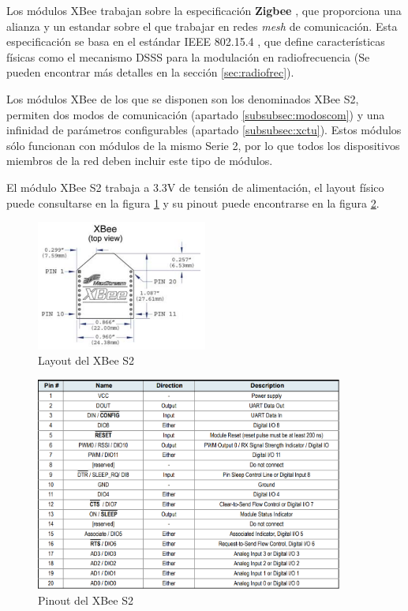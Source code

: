Los módulos XBee trabajan sobre la especificación \textbf{Zigbee} \cite{Zigbee:2019}, que proporciona una alianza y un estandar sobre el que trabajar en redes \textit{mesh} de comunicación. Esta especificación se basa en el estándar IEEE 802.15.4 \cite{IEEE:2007}, que define características físicas como el mecanismo DSSS para la modulación en radiofrecuencia (Se pueden encontrar más detalles en la sección \ref{sec:radiofrec}).

Los módulos XBee de los que se disponen son los denominados XBee S2\cite{XbeeS2:2007}, permiten dos modos de comunicación (apartado \ref{subsubsec:modoscom}) y una infinidad de parámetros configurables (apartado \ref{subsubsec:xctu}). Estos módulos sólo funcionan con módulos de la mismo Serie 2, por lo que todos los dispositivos miembros de la red deben incluir este tipo de módulos.

El módulo XBee S2 trabaja a 3.3V de tensión de alimentación, el layout físico puede consultarse en la figura \ref{fig:XBLayout} y su pinout puede encontrarse en la figura \ref{fig:XBPinout}.

\begin{figure}[tb]
\centering
\includegraphics[width=0.5\textwidth]{figuras/XBeeLayout.png}
\caption{Layout del XBee S2}
\label{fig:XBLayout}
\end{figure}

\begin{figure}[bt]
\centering
\includegraphics[width=0.9\textwidth]{figuras/XBeePinout.png}
\caption{Pinout del XBee S2}
\label{fig:XBPinout}
\end{figure}

